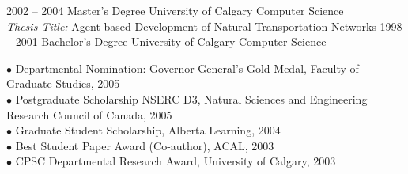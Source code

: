 \documentclass[9pt]{developercv}
\begin{document}

\begin{entrylist}
	\entry
		{2002 -- 2004}
		{Master's Degree}
		{University of Calgary}
		{Computer Science\\\footnotesize{{\sl Thesis Title:} Agent-based Development of Natural Transportation Networks}}
	\entry
		{1998 -- 2001}
		{Bachelor's Degree}
		{University of Calgary}
		{Computer Science}
\end{entrylist}


$\bullet$ Departmental Nomination: Governor General's Gold Medal, Faculty of Graduate Studies, 2005\\
$\bullet$ Postgraduate Scholarship NSERC D3, Natural Sciences and Engineering Research Council of Canada, 2005\\
$\bullet$ Graduate Student Scholarship, Alberta Learning, 2004\\
$\bullet$ Best Student Paper Award (Co-author), ACAL, 2003\\
$\bullet$ CPSC Departmental Research Award, University of Calgary, 2003\\

\end{document}

